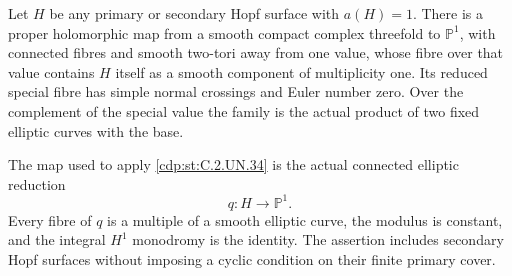 
\begin{proposition}\label{cdp:st:C.2.UN.37}
Let $H$ be any primary or secondary Hopf surface with $a(H)=1$.
There is a proper holomorphic map from a smooth compact complex
threefold to $\mathbb P^1$, with connected fibres and smooth
two-tori away from one value, whose fibre over that value contains
$H$ itself as a smooth component of multiplicity one. Its reduced
special fibre has simple normal crossings and Euler number zero.
Over the complement of the special value the family is the
actual product of two fixed elliptic curves with the base.

The map used to apply \ref{cdp:st:C.2.UN.34} is the actual connected elliptic
reduction
\[
                         q:H\longrightarrow\mathbb P^1.
\tag{C.EH.1}\label{cdp:eq:C.EH.1}
\]
Every fibre of $q$ is a multiple of a smooth elliptic curve,
the modulus is constant, and the integral $H^1$ monodromy is
the identity. The assertion includes secondary Hopf surfaces
without imposing a cyclic condition on their finite primary cover.
\end{proposition}

